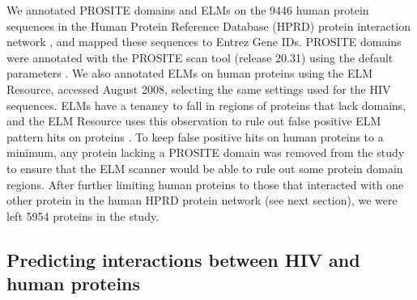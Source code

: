 We annotated PROSITE domains and ELMs on the 9446 human protein
sequences in the Human Protein Reference Database (HPRD) protein
interaction network \cite{prasad08}, and mapped these sequences to
Entrez Gene IDs. PROSITE domains were annotated with the PROSITE scan
tool (release 20.31) using the default parameters
\cite{decastro06}. We also annotated ELMs on human proteins using the
ELM Resource, accessed August 2008, selecting the same settings used
for the HIV sequences. ELMs have a tenancy to fall in regions of
proteins that lack domains, and the ELM Resource uses this observation
to rule out false positive ELM pattern hits on proteins
\cite{puntervoll03,neduva06nuc,edwards07}. To keep false positive hits
on human proteins to a minimum, any protein lacking a PROSITE domain
was removed from the study to ensure that the ELM scanner would be
able to rule out some protein domain regions. After further limiting
human proteins to those that interacted with one other protein in the
human HPRD protein network (see next section), we were left 5954
proteins in the study.


\subsection{Predicting interactions between HIV and human proteins}

